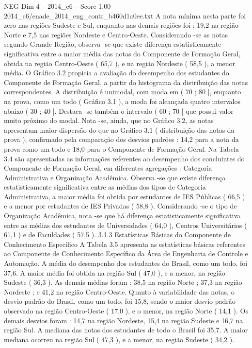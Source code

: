 \begin{textsample}{NEG Dim 4 – 2014\_c6 – Score 1.00 – 2014\_c6/enade\_2014\_eng\_contr\_b460d1a0ee.txt}
A nota mínima nesta parte foi zero nas regiões Sudeste e Sul, enquanto nas demais regiões foi : 19,2 na região Norte e 7,5 nas regiões Nordeste e Centro-Oeste.
Considerando -se as notas segundo Grande Região, observa -se que existe diferença estatisticamente significativa entre a maior média das notas do Componente de Formação Geral, obtida na região Centro-Oeste ( 65,7 ), e na região Nordeste ( 58,5 ), a menor média.
O Gráfico 3.2 propicia a avaliação do desempenho dos estudantes do Componente de Formação Geral, a partir do histograma da distribuição das notas correspondentes.
A distribuição é unimodal, com moda em ( 70 ; 80 ], enquanto na prova, como um todo ( Gráfico 3.1 ), a moda foi alcançada quatro intervalos abaixo ( 30 ; 40 ].
Destaca -se também o intervalo ( 60 ; 70 ] que possui valor muito próximo do modal.
Nota -se, ainda, que no Gráfico 3.2, as notas apresentam maior dispersão do que no Gráfico 3.1 ( distribuição das notas da prova ), confirmado pela comparação dos desvios padrões : 14,2 para a nota da prova como um todo e 18,0 para o Componente de Formação Geral.
Na Tabela 3.4 são apresentadas as informações referentes ao desempenho dos concluintes do Componente de Formação Geral, em diferentes agregações : Categoria Administrativa e Organização Acadêmica.
Observa -se que existe diferença estatisticamente significativa entre as médias dos tipos de Categoria Administrativa, a maior média foi obtida por estudantes de IES Públicas ( 66,5 ) e a menor por estudantes de IES Privadas ( 58,8 ).
Considerando -se o tipo de Organização Acadêmica, nota -se que há diferença estatisticamente significativa entre as médias dos estudantes de Universidades ( 64,0 ), Centros Universitários ( 61,1 ) e de Faculdades ( 57,5 ). 3.1.3 Estatísticas Básicas do Componente de Conhecimento Específico A Tabela 3.5 apresenta as estatísticas básicas referentes ao Componente de Conhecimento Específico da Área de Engenharia de Controle e Automação.
A média do desempenho dos estudantes do Brasil, como um todo, foi 37,6.
A maior média foi obtida na região Sul ( 47,0 ), e a menor, na região Sudeste ( 36,3 ).
As demais médias foram : 38,5 na região Norte ; 37,3 na região Nordeste ; e 41,2 na região Centro-Oeste.
Quanto à variabilidade das notas, o desvio padrão do Brasil, como um todo, foi 15,8, sendo o maior desvio padrão observado na região Centro-Oeste ( 17,0 ), e o menor, na região Norte ( 14,1 ).
Os demais desvios foram : 14,7 na região Nordeste, 15,4 na região Sudeste e 16,7 na região Sul.
A mediana das notas dos estudantes de todo o Brasil foi 35,7.
A maior mediana ocorreu na região Sul ( 47,3 ), e a menor, na região Sudeste ( 34,2 ).

\end{textsample}
